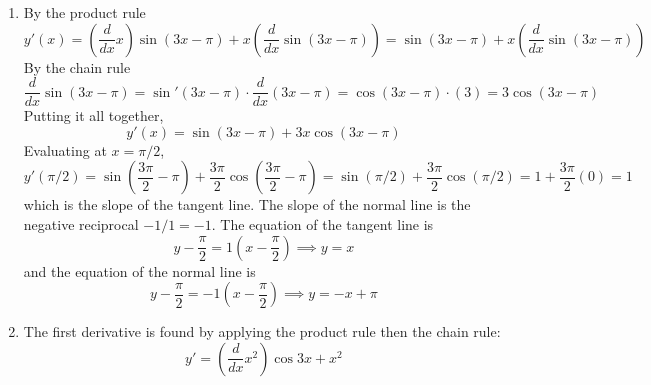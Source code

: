 \documentclass{article}
\begin{document}
\begin{enumerate}
\item %
  By the product rule
  \begin{equation*}
    y'(x) = \left(\frac{d}{dx} x\right) \sin(3x-\pi) + x \left(\frac{d}{dx} \sin(3x-\pi) \right)
    = \sin(3x-\pi) + x \left(\frac{d}{dx} \sin(3x-\pi)\right)
  \end{equation*}
  By the chain rule
  \begin{equation*}
    \frac{d}{dx} \sin(3x-\pi) = \sin'(3x-\pi) \cdot \frac{d}{dx}(3x-\pi)
    = \cos(3x-\pi) \cdot (3) = 3 \cos (3x-\pi)
  \end{equation*}
  Putting it all together,
  \begin{equation*}
    y'(x) = \sin(3x-\pi) + 3x \cos (3x-\pi)
  \end{equation*}
  Evaluating at $x=\pi/2$,
  \begin{equation*}
    y'(\pi/2) = \sin\left(\frac{3\pi}{2} - \pi\right) + \frac{3\pi}{2} \cos\left(\frac{3\pi}{2}-\pi\right)
    = \sin(\pi/2) + \frac{3\pi}{2} \cos(\pi/2) = 1 + \frac{3\pi}{2} (0) = 1
  \end{equation*}
  which is the slope of the tangent line.  The slope of the normal
  line is the negative reciprocal $-1/1=-1$.  The equation of the
  tangent line is
  \begin{equation*}
    y - \frac{\pi}{2} = 1 \left(x - \frac{\pi}{2}\right) \implies y = x
  \end{equation*}
  and the equation of the normal line is
  \begin{equation*}
    y - \frac{\pi}{2} = -1 \left(x - \frac{\pi}{2}\right)
    \implies y = -x + \pi
  \end{equation*}
\item %
  The first derivative is found by applying the product rule then the
  chain rule:
  \begin{equation*}
    y' = \left(\frac{d}{dx} x^2 \right) \cos 3x + x^2

\end{equation*}
\end{enumerate}
\end{document}
